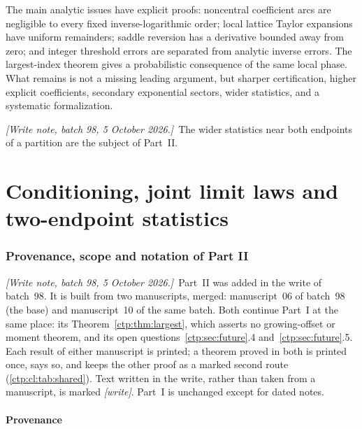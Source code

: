 \documentclass[11pt,a4paper]{article}
\numberwithin{equation}{section}
\theoremstyle{definition}
\theoremstyle{remark}
\newcommand{\writenoteB}[1]{\par\smallskip\noindent
 \textit{[Write note, batch 98, 5 October 2026.]}\ #1\par\smallskip}
\begin{document}
The main analytic issues have explicit proofs: noncentral coefficient
arcs are negligible to every fixed inverse-logarithmic order; local
lattice Taylor expansions have uniform remainders; saddle reversion has
a derivative bounded away from zero; and integer threshold errors are
separated from analytic inverse errors. The largest-index theorem gives
a probabilistic consequence of the same local phase. What remains is not
a missing leading argument, but sharper certification, higher explicit
coefficients, secondary exponential sectors, wider statistics, and a
systematic formalization.

\writenoteB{The wider statistics near both endpoints of a partition are
the subject of Part~II.}

\part{Conditioning, joint limit laws and two-endpoint statistics}
\label{ctp:cl:part}

\section{Provenance, scope and notation of Part II}
\label{ctp:cl:sec:front}

\writenoteB{Part~II was added in the write of batch~98. It is built from two
manuscripts, merged: manuscript~06 of batch~98 (the base) and manuscript~10
of the same batch. Both continue Part~I at the same place: its
Theorem~\ref{ctp:thm:largest}, which asserts no growing-offset or moment
theorem, and its open questions~\ref{ctp:sec:future}.4 and~\ref{ctp:sec:future}.5. Each result
of either manuscript is printed; a theorem proved in both is printed once,
says so, and keeps the other proof as a marked second route
(\cref{ctp:cl:tab:shared}). Text written in the write, rather than taken
from a manuscript, is marked \emph{[write]}. Part~I is unchanged except for
dated notes.}

\subsection{Provenance}
\label{ctp:cl:sec:provenance}
\end{document}
